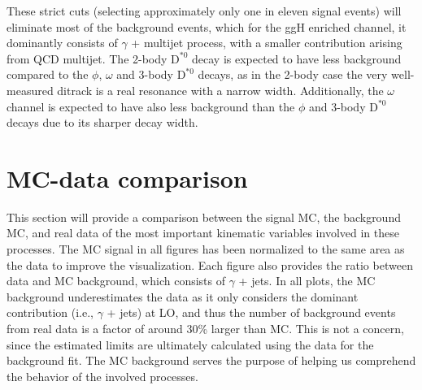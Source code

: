These strict cuts (selecting approximately only one in eleven signal events) will eliminate most of the background events, which for the ggH enriched channel, it dominantly consists of $\gamma$ + multijet process, with a smaller contribution arising from QCD multijet. The 2-body $\text{D}^{*0}$ decay is expected to have less background compared to the $\phi$, $\omega$ and 3-body $\text{D}^{*0}$ decays, as in the 2-body case the very well-measured ditrack is a real resonance with a narrow width. Additionally, the $\omega$ channel is expected to have also less background than the $\phi$ and 3-body $\text{D}^{*0}$ decays due to its sharper decay width.

\section{MC-data comparison}

This section will provide a comparison between the signal MC, the background MC, and real data of the most important kinematic variables involved in these processes. The MC signal in all figures has been normalized to the same area as the data to improve the visualization. Each figure also provides the ratio between data and MC background, which consists of $\gamma$ + jets. In all plots, the MC background underestimates the data as it only considers the dominant contribution (i.e., $\gamma$ + jets) at LO, and thus the number of background events from real data is a factor of around 30\% larger than MC. This is not a concern, since the estimated limits are ultimately calculated using the data for the background fit. The MC background serves the purpose of helping us comprehend the behavior of the involved processes.

